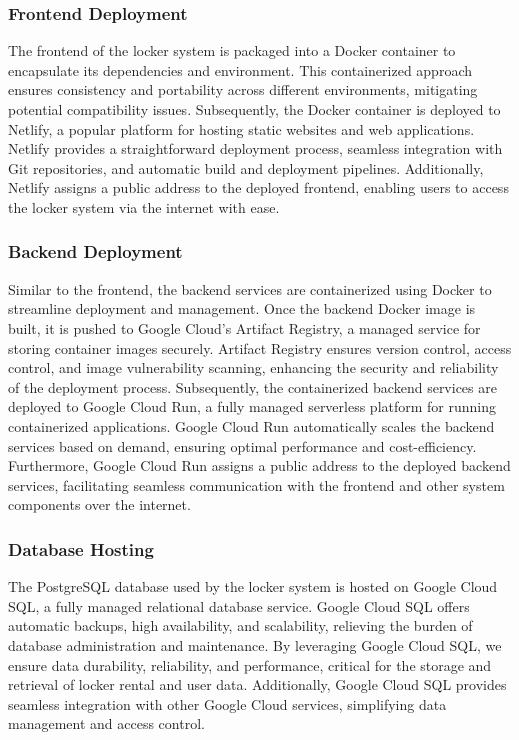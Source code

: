 \subsubsection{Frontend Deployment}

The frontend of the locker system is packaged into a Docker container to encapsulate its dependencies and environment. This containerized approach ensures consistency and portability across different environments, mitigating potential compatibility issues. Subsequently, the Docker container is deployed to Netlify, a popular platform for hosting static websites and web applications. Netlify provides a straightforward deployment process, seamless integration with Git repositories, and automatic build and deployment pipelines. Additionally, Netlify assigns a public address to the deployed frontend, enabling users to access the locker system via the internet with ease.

\subsubsection{Backend Deployment}

Similar to the frontend, the backend services are containerized using Docker to streamline deployment and management. Once the backend Docker image is built, it is pushed to Google Cloud's Artifact Registry, a managed service for storing container images securely. Artifact Registry ensures version control, access control, and image vulnerability scanning, enhancing the security and reliability of the deployment process. Subsequently, the containerized backend services are deployed to Google Cloud Run, a fully managed serverless platform for running containerized applications. Google Cloud Run automatically scales the backend services based on demand, ensuring optimal performance and cost-efficiency. Furthermore, Google Cloud Run assigns a public address to the deployed backend services, facilitating seamless communication with the frontend and other system components over the internet.

\subsubsection{Database Hosting}

The PostgreSQL database used by the locker system is hosted on Google Cloud SQL, a fully managed relational database service. Google Cloud SQL offers automatic backups, high availability, and scalability, relieving the burden of database administration and maintenance. By leveraging Google Cloud SQL, we ensure data durability, reliability, and performance, critical for the storage and retrieval of locker rental and user data. Additionally, Google Cloud SQL provides seamless integration with other Google Cloud services, simplifying data management and access control.


